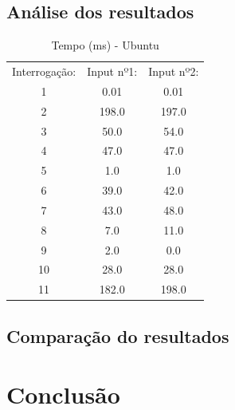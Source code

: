 \documentclass[a4paper, 11pt, oneside]{article}
\begin{document}
\subsection{Análise dos resultados}

\begin{table}[h] 
	\centering
	\caption{Tempo (ms) - Ubuntu}	
	\begin{tabular}{c|c|c}
	Interrogação: & Input nº1:      & Input nº2:      \\
	1             & 0.01            & 0.01            \\
	2             & 198.0           & 197.0           \\
	3             & 50.0            & 54.0            \\
	4             & 47.0            & 47.0            \\
	5             & 1.0             & 1.0             \\
	6             & 39.0            & 42.0            \\
	7             & 43.0            & 48.0            \\
	8             & 7.0             & 11.0            \\
	9             & 2.0             & 0.0             \\
	10            & 28.0            & 28.0            \\
	11            & 182.0           & 198.0  
	\end{tabular}
\end{table}



\subsection{Comparação do resultados}






\section{Conclusão}


\end{document}
